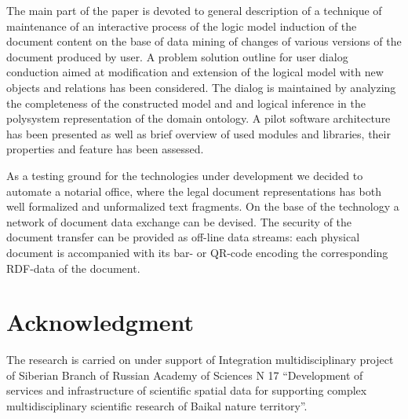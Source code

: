 \documentclass[conference]{IEEEtran}
\begin{document}
The main part of the paper is devoted to general description of a
technique of maintenance of an interactive process of the logic model
induction of the document content on the base of data mining of
changes of various versions of the document produced by user.  A
problem solution outline for user dialog conduction aimed at
modification and extension of the logical model with new objects and
relations has been considered.  The dialog is maintained by analyzing
the completeness of the constructed model and and logical inference in
the polysystem representation of the domain ontology.  A pilot
software architecture has been presented as well as brief overview of
used modules and libraries, their properties and feature has been
assessed.

As a testing ground for the technologies under development we decided
to automate a notarial office, where the legal document
representations has both well formalized and unformalized text
fragments.  On the base of the technology a network of document data
exchange can be devised. The security of the document transfer can
be provided as off-line data streams: each physical document is
accompanied with its bar- or QR-code encoding the corresponding
RDF-data of the document.



\section*{Acknowledgment}
The research is carried on under support of Integration multidisciplinary project of Siberian Branch of Russian Academy of Sciences N 17 “Development of services and infrastructure of scientific spatial data for supporting complex multidisciplinary scientific research of Baikal nature territory”.







\end{document}
